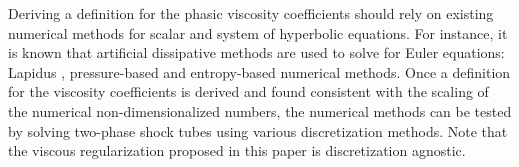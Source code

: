 \documentclass[preprint,10pt]{elsarticle}
\begin{document}
Deriving a definition for the phasic viscosity coefficients should rely on existing numerical methods for scalar and system of hyperbolic equations. For instance, it is known that artificial dissipative methods are used to solve for Euler equations: Lapidus \cite{Lapidus_paper, Lapidus_book}, pressure-based \cite{PBV_book} and entropy-based \cite{jlg1, valentin} numerical methods. Once a definition for the viscosity coefficients is derived and found consistent with the scaling of the numerical non-dimensionalized numbers, the numerical methods can be tested by solving two-phase shock tubes using various discretization methods. Note that the viscous regularization proposed in this paper is discretization agnostic. 

\clearpage
\end{document}
